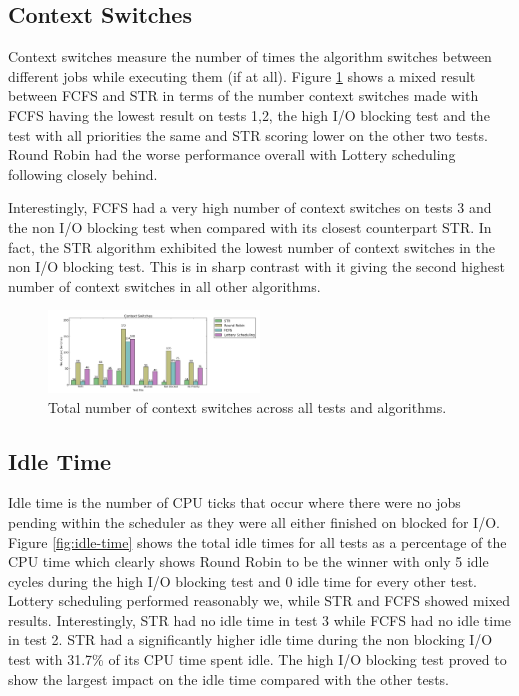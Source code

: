 \documentclass{acm_proc_article-sp}
\begin{document}
\subsection{Context Switches}
Context switches measure the number of times the algorithm switches between different jobs while executing them (if at all). Figure \ref{fig:ctex-switches} shows a mixed result between FCFS and STR in terms of the number context switches made with FCFS having the lowest result on tests 1,2, the high I/O blocking test and the test with all priorities the same and STR scoring lower on the other two tests. Round Robin had the worse performance overall with Lottery scheduling following closely behind. 

Interestingly, FCFS had a very high number of context switches on tests 3 and the non I/O blocking test when compared with its closest counterpart STR. In fact, the STR algorithm exhibited the lowest number of context switches in the non I/O blocking test. This is in sharp contrast with it giving the second highest number of context switches in all other algorithms.

\begin{figure}[H]
\centering
\includegraphics[width=0.5\textwidth]{ctex_switches.png}
\caption{Total number of context switches across all tests and algorithms.}
\label{fig:ctex-switches}
\end{figure}

\subsection{Idle Time}
Idle time is the number of CPU ticks that occur where there were no jobs pending within the scheduler as they were all either finished on blocked for I/O. Figure \ref{fig:idle-time} shows the total idle times for all tests as a percentage of the CPU time which clearly shows Round Robin to be the winner with only 5 idle cycles during the high I/O blocking test and 0 idle time for every other test. Lottery scheduling performed reasonably we, while STR and FCFS showed mixed results. Interestingly, STR had no idle time in test 3 while FCFS had no idle time in test 2. STR had a significantly higher idle time during the non blocking I/O test with 31.7\% of its CPU time spent idle. The high I/O blocking test proved to show the largest impact on the idle time compared with the other tests.
\end{document}
